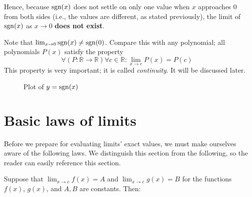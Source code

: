 Hence, because $\operatorname{sgn}(x)$ does not settle on only one value when $x$ approaches $0$ from both sides
(i.e., the values are different, as stated previously), the limit of $\operatorname{sgn}(x)$ as $x \to 0$ \textbf{does
not exist}.

Note that $\lim_{x \to 0} \operatorname{sgn}(x) \ne \operatorname{sgn}(0)$. Compare this with any polynomial; all polynomials $P(x)$
satisfy the property \[\forall (P : \mathbb{R} \to \mathbb{R}) \forall c \in \mathbb{R} : \lim_{x \to c} P(x) = P(c)\]
This property is very important; it is called \textit{continuity}. It will be discussed later.

\begin{figure}
    \centering
    \caption{Plot of $y = \operatorname{sgn}(x)$}
    \label{fig:sgn}
\end{figure}

\newpage

\section{Basic laws of limits}
Before we prepare for evaluating limits' exact values, we must make ourselves aware of the following laws.
We distinguish this section from the following, so the reader can easily reference this section.

Suppose that $\lim_{x \to c} f(x) = A$ and $\lim_{x \to c} g(x) = B$ for the functions $f(x)$, $g(x)$,
and $A,B$ are constants. Then:

